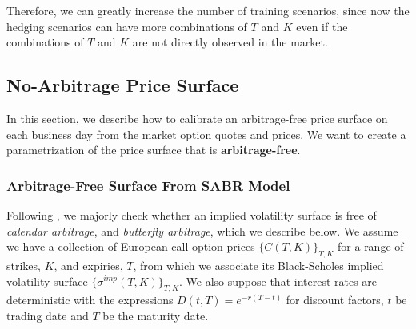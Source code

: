 \documentclass[letterpaper,12pt,titlepage,oneside,final]{book}
\numberwithin{equation}{section}
\theoremstyle{definition}
\begin{document}
Therefore, we can greatly increase the number of training scenarios, since now the hedging scenarios can have more combinations of $T$ and $K$ even if the combinations of $T$ and $K$ are not directly observed in the market. 

\subsection{No-Arbitrage Price Surface}
\label{sec:NoArb}
In this section, we describe how to calibrate an arbitrage-free price surface on each business day from the market option quotes and prices. We want to create a parametrization of the price surface that is \textbf{arbitrage-free}. 

\subsubsection{Arbitrage-Free Surface From SABR Model}
Following \cite{gatheral2014arbitrage}, we majorly check whether  an implied volatility surface is free of \textit{calendar arbitrage}, and \textit{butterfly arbitrage}, which we describe below. We assume we have a collection of European call option prices $\{C(T,K)\}_{T,K}$ for a range of strikes, $K$, and expiries, $T$, from which we associate its Black-Scholes implied volatility surface $\{ \sigma^{imp}(T,K)\}_{T,K}$. We also suppose that interest rates are deterministic with the expressions $D(t,T)=e^{-r(T-t)}$ for discount factors, $t$ be trading date and $T$ be the maturity date.
\end{document}
